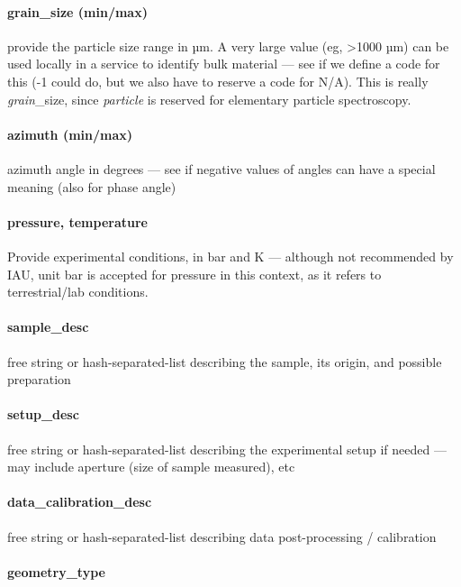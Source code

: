 \documentclass[11pt,a4paper]{ivoa}
\begin{document}
\paragraph{grain\_size (min/max)}

provide the particle size range in µm. A very large value (eg, >1000
µm) can be used locally in a service to identify bulk material --- see
if we define a code for this (-1 could do, but we also have to reserve a
code for N/A). This is really \emph{grain}\_size, since \emph{particle}
is reserved for elementary particle spectroscopy.

\paragraph{azimuth (min/max)}

azimuth angle in degrees --- see if negative values of angles
can have a special meaning (also for phase angle)

\paragraph{pressure, temperature}

Provide experimental conditions, in bar and K --- although not recommended
by IAU, unit bar is accepted for pressure in this context, as it refers
to terrestrial/lab conditions.

\paragraph{sample\_desc}

free string or hash-separated-list describing the sample, its origin,
and possible preparation

\paragraph{setup\_desc}

free string or hash-separated-list describing the experimental setup if
needed --- may include aperture (size of sample measured), etc

\paragraph{data\_calibration\_desc}

free string or hash-separated-list describing data post-processing /
calibration

\paragraph{geometry\_type}
\end{document}
